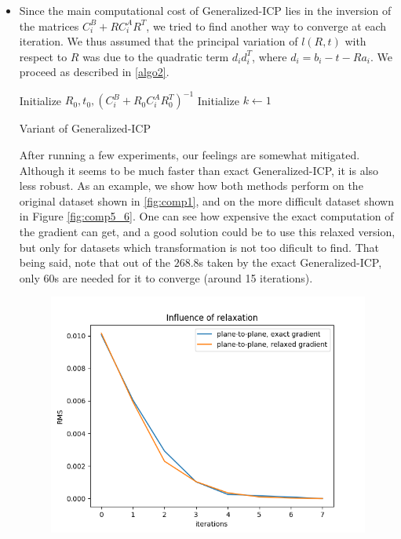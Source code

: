 \documentclass[11pt,letterpaper,leqno]{article}
\begin{document}
\begin{itemize}
    \item Since the main computational cost of Generalized-ICP lies in the inversion of the matrices $C_i^B + R C_i^A R^T$, we tried to find another way to converge at each iteration. We thus assumed that the principal variation of $l(R,t)$ with respect to $R$ was due to the quadratic term $d_i d_i^T$, where $d_i = b_i - t -Ra_i$. We proceed as described in \autoref{algo2}.
    \begin{algorithm}[H]
        \SetAlgoLined
         Initialize $R_0,t_0, (C_i^B + R_0 C_i^A R_0^T)^{-1}$\;
         Initialize $k \gets 1$\;
        \caption{Variant of Generalized-ICP}
        \label{algo2}
    \end{algorithm}
    After running a few experiments, our feelings are somewhat mitigated. Although it seems to be much faster than exact Generalized-ICP, it is also less robust. As an example, we show how both methods perform on the original dataset shown in \ref{fig:comp1}, and on the more difficult dataset shown in Figure \ref{fig:comp5_6}. One can see how expensive the exact computation of the gradient can get, and a good solution could be to use this relaxed version, but only for datasets which transformation is not too dificult to find. That being said, note that out of the $268.8$s taken by the exact Generalized-ICP, only $60$s are needed for it to converge (around 15 iterations).
    \begin{figure}[ht!]
        \centering
        \begin{minipage}{0.5\linewidth}
        \includegraphics[width=\linewidth]{img/comparison_relaxed_1.png}

\end{minipage}
\end{figure}
\end{itemize}
\end{document}
